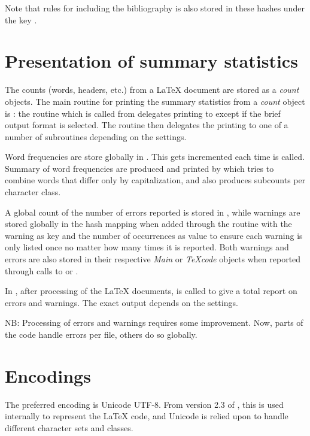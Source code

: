 \documentclass{article}
\newcommand\Obj[1]{\textsl{#1}}
\begin{document}
Note that rules for including the bibliography is also stored in these hashes under the key .



\section{Presentation of summary statistics}

The counts (words, headers, etc.) from a \LaTeX{} document are stored as a \Obj{count} objects. The main routine for printing the summary statistics from a \Obj{count} object is : the routine  which is called from  delegates printing to  except if the brief output format is selected. The  routine then delegates the printing to one of a number of subroutines depending on the settings.

Word frequencies are store globally in . This gets incremented each time  is called. Summary of word frequencies are produced and printed by  which tries to combine words that differ only by capitalization, and also produces subcounts per character class.

A global count of the number of errors reported is stored in , while warnings are stored globally in the  hash mapping when added through the  routine with the warning as key and the number of occurrences as value to ensure each warning is only listed once no matter how many times it is reported. Both warnings and errors are also stored in their respective \Obj{Main} or \Obj{TeXcode} objects when reported through calls to  or .

In , after processing of the \LaTeX{} documents,  is called to give a total report on errors and warnings. The exact output depends on the settings.

NB: Processing of errors and warnings requires some improvement. Now, parts of the code handle errors per file, others do so globally.



\section{Encodings}

The preferred encoding is Unicode UTF-8. From version 2.3 of \TeXcount{}, this is used internally to represent the \LaTeX{} code, and Unicode is relied upon to handle different character sets and classes.
\end{document}
